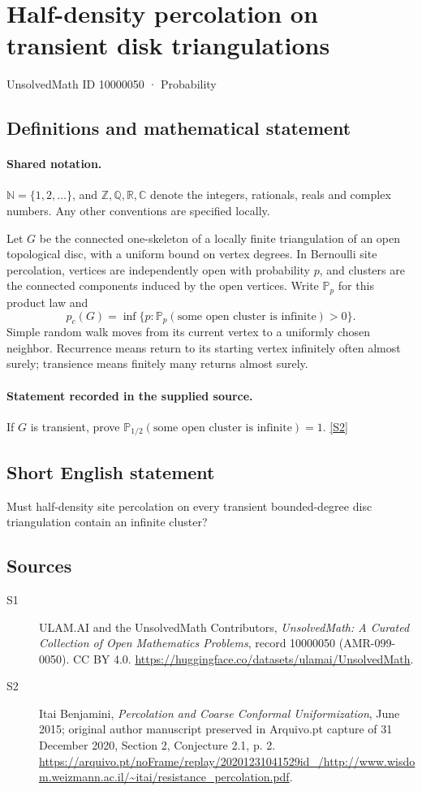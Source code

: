 \documentclass[11pt]{article}
\newcommand{\sref}[2]{\hyperlink{source:#1:#2}{[S#2]}}
\begin{document}
\setcounter{section}{10000049}
\section{Half-density percolation on transient disk triangulations}\label{10000050}
{\small\sffamily UnsolvedMath ID 10000050 · Probability}
\subsection{Definitions and mathematical statement}

\paragraph{Shared notation.}$\mathbb N=\{1,2,\ldots\}$, and $\mathbb Z,\mathbb Q,\mathbb R,\mathbb C$ denote the integers, rationals, reals and complex numbers. Any other conventions are specified locally.


Let $G$ be the connected one-skeleton of a locally finite triangulation of an open topological disc, with a uniform bound on vertex degrees. In Bernoulli site percolation, vertices are independently open with probability $p$, and clusters are the connected components induced by the open vertices. Write $\mathbb P_p$ for this product law and
\[p_c(G)=\inf\{p:\mathbb P_p(\text{some open cluster is infinite})>0\}.\]
Simple random walk moves from its current vertex to a uniformly chosen neighbor. Recurrence means return to its starting vertex infinitely often almost surely; transience means finitely many returns almost surely.
\paragraph{Statement recorded in the supplied source.}
If $G$ is transient, prove $\mathbb P_{1/2}(\text{some open cluster is infinite})=1$. \sref{10000050}{2}
\subsection{Short English statement}
Must half-density site percolation on every transient bounded-degree disc triangulation contain an infinite cluster?
\subsection{Sources}
\begin{description}
\item[\hypertarget{source:10000050:1}{S1}] ULAM.AI and the UnsolvedMath Contributors, \emph{UnsolvedMath: A Curated Collection of Open Mathematics Problems}, record 10000050 (AMR-099-0050). CC BY 4.0. \url{https://huggingface.co/datasets/ulamai/UnsolvedMath}.
\item[\hypertarget{source:10000050:2}{S2}] Itai Benjamini, \emph{Percolation and Coarse Conformal Uniformization}, June 2015; original author manuscript preserved in Arquivo.pt capture of 31 December 2020, Section 2, Conjecture 2.1, p. 2. \url{https://arquivo.pt/noFrame/replay/20201231041529id_/http://www.wisdom.weizmann.ac.il/~itai/resistance_percolation.pdf}.
\end{description}
\label{end:10000050}
\end{document}
